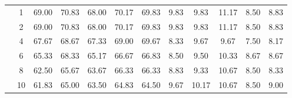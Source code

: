 \begin{table}[H]
\begin{tabular}{|c|c|c c c c c|c c c c c|}
\multicolumn{1}{|c|}{ \multirow{6}{*}{\rotatebox[origin=c]{90}{\textbf{K-vizinhos}}} }
&1	&69.00&	70.83	&68.00&	70.17&	69.83&	9.83&	9.83&	11.17	&8.50	&8.83\\\cline{2-12}
&2	&69.00&	70.83	&68.00&	70.17&	69.83&	9.83&	9.83&	11.17	&8.50	&8.83\\\cline{2-12}
&4	&67.67&	68.67	&67.33&	69.00&	69.67&	8.33&	9.67&	9.67	&7.50	&8.17\\\cline{2-12}
&6	&65.33&	68.33	&65.17&	66.67&	66.83&	8.50&	9.50&	10.33	&8.67	&8.67\\\cline{2-12}
&8	&62.50&	65.67	&63.67&	66.33&	66.33&	8.83&	9.33&	10.67	&8.50	&8.33\\\cline{2-12}
&10	&61.83&	65.00	&63.50&	64.83&	64.50&	9.67&	10.17&	10.67	&8.50	&9.00%

\\\midrule

	\end{tabular}
\end{table}







